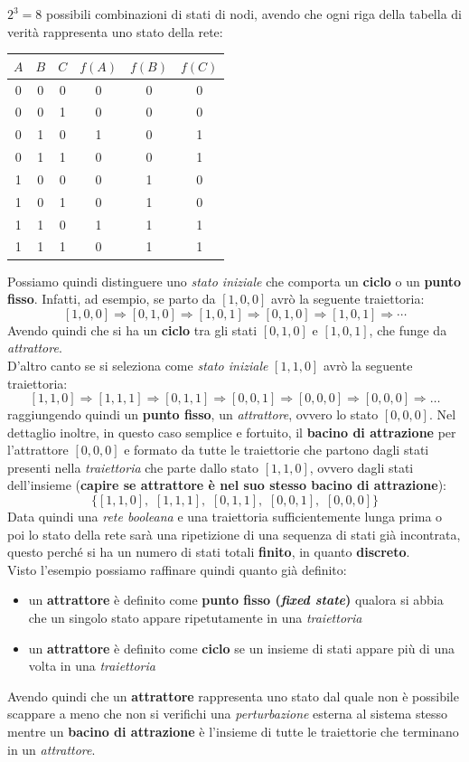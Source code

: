 \documentclass[a4paper,12pt, oneside]{book}
\begin{document}
$2^3=8$ possibili combinazioni di stati di nodi, avendo che ogni riga della
tabella di verità rappresenta uno stato della rete:
\begin{table}[H]
  \centering
  \begin{tabular}{c|c|c||c|c|c}
    $A$&$B$&$C$&$f(A)$ & $f(B)$ & $f(C)$\\
    \hline
    0 & 0 & 0 & 0 & 0 & 0\\
    0 & 0 & 1 & 0 & 0 & 0\\
    0 & 1 & 0 & 1 & 0 & 1\\
    0 & 1 & 1 & 0 & 0 & 1\\
    1 & 0 & 0 & 0 & 1 & 0\\
    1 & 0 & 1 & 0 & 1 & 0\\
    1 & 1 & 0 & 1 & 1 & 1\\
    1 & 1 & 1 & 0 & 1 & 1\\
  \end{tabular}
\end{table}
Possiamo quindi distinguere uno \textit{stato iniziale} che comporta un
\textbf{ciclo} o un \textbf{punto fisso}. Infatti, ad esempio, se parto da
$[1,0,0]$ avrò la seguente traiettoria: 
\[[1,0,0]\Rightarrow [0,1,0]\Rightarrow [1,0,1] \Rightarrow [0,1,0]\Rightarrow
  [1,0,1]\Rightarrow\cdots\]
Avendo quindi che si ha un \textbf{ciclo} tra gli stati $[0,1,0]$ e $[1,0,1]$,
che funge da \textit{attrattore}.\\
D'altro canto se si seleziona come \textit{stato iniziale} $[1,1,0]$ avrò la
seguente traiettoria:
\[[1,1,0]\Rightarrow[1,1,1]\Rightarrow[0,1,1]\Rightarrow[0,0,1]
  \Rightarrow[0,0,0]\Rightarrow[0,0,0]\Rightarrow\ldots\]
raggiungendo quindi un \textbf{punto fisso}, un \textit{attrattore}, ovvero lo
stato $[0,0,0]$. Nel dettaglio inoltre, in questo caso semplice e fortuito, il
\textbf{bacino di attrazione} per l'attrattore $[0,0,0]$ e formato da tutte le
traiettorie che partono dagli
stati presenti nella \textit{traiettoria} che parte dallo stato $[1,1,0]$,
ovvero dagli stati dell'insieme (\textbf{capire se attrattore è nel suo stesso
  bacino di attrazione}): 
\[\{[1,1,0],\,\,[1,1,1],\,\,[0,1,1],\,\,[0,0,1],\,\,[0,0,0]\}\]
Data quindi una \textit{rete booleana} e una traiettoria sufficientemente lunga
prima o poi lo stato della rete sarà una ripetizione di una sequenza di stati
già incontrata, questo perché si ha un numero di stati totali \textbf{finito},
in quanto \textbf{discreto}.\\
Visto l'esempio possiamo raffinare quindi quanto già definito:
\begin{itemize}
  \item un \textbf{attrattore} è definito come \textbf{punto fisso
    (\textit{fixed state})} qualora si abbia che un singolo stato appare
  ripetutamente in una \textit{traiettoria}
  \item un \textbf{attrattore} è definito come \textbf{ciclo} se un insieme di
  stati appare più di una volta in una \textit{traiettoria}
\end{itemize}
Avendo quindi che un \textbf{attrattore} rappresenta uno stato dal quale non è
possibile scappare a meno che non si verifichi una \textit{perturbazione}
esterna al sistema stesso mentre un \textbf{bacino di attrazione} è l'insieme di
tutte le traiettorie che terminano in un \textit{attrattore}.
\end{document}
